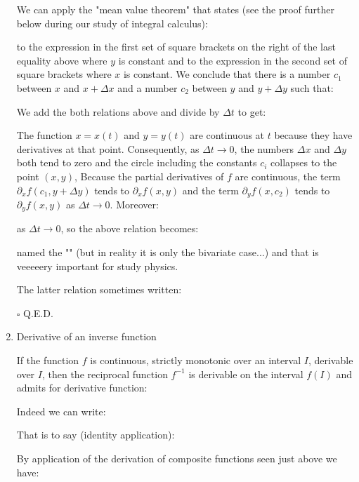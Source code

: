 \begin{enumerate}
\begin{dem}
			We can apply the "mean value theorem" that states (see the proof further below during our study of integral calculus):
						
			 to the expression in the first set of square brackets on the right of the last equality above where $y$ is constant and to the expression in the second set of square brackets where $x$ is constant. We conclude that there is a number $c_1$ between $x$ and $x+\Delta x$ and a number $c_2$ between $y$ and $y+\Delta y$ such that:
			
			We add the both relations above and divide by $\Delta t$ to get:
			
			The function $x=x(t)$ and $y=y(t)$ are continuous at $t$ because they have derivatives at that point. Consequently, as $\Delta t\rightarrow 0$, the numbers $\Delta x$ and $\Delta y$ both tend to zero and the circle including the constants $c_i$ collapses to the point $(x,y)$, Because the partial derivatives of $f$ are continuous, the term $\partial_x f(c_1,y+\Delta y)$ tends to $\partial_x f(x,y)$ and the term $\partial_y f(x,c_2)$ tends to $\partial_y f(x,y)$ as $\Delta t\rightarrow 0$. Moreover:
		
		as $\Delta t\rightarrow 0$, so the above relation becomes:
			
			 named the "\label{multivariate chain rule}" (but in reality it is only the bivariate case...) and that is veeeeery important for study physics.
			 
			 The latter relation sometimes written:
			 
		 	\begin{flushright}
			$\square$  Q.E.D.
			\end{flushright}
		 \end{dem}
		 
		 \item Derivative of an inverse function
		 \begin{theorem}
		 	If the function $f$ is continuous, strictly monotonic over an interval $I$, derivable over $I$, then the reciprocal function $f^{-1}$ is derivable on the interval $f(I)$ and admits for derivative function:
		 	
		 \end{theorem}
		 \begin{dem}
		 	Indeed we can write:
		 	
		 	That is to say (identity application):
		 	
		 	By application of the derivation of composite functions seen just above we have:
		 	

\end{dem}
\end{enumerate}
